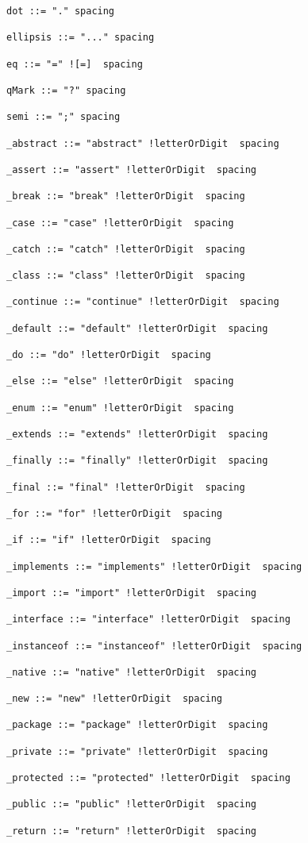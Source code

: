 \begin{lstlisting}[breaklines=true]
dot ::= "." spacing

ellipsis ::= "..." spacing

eq ::= "=" ![=]  spacing

qMark ::= "?" spacing

semi ::= ";" spacing

_abstract ::= "abstract" !letterOrDigit  spacing

_assert ::= "assert" !letterOrDigit  spacing

_break ::= "break" !letterOrDigit  spacing

_case ::= "case" !letterOrDigit  spacing

_catch ::= "catch" !letterOrDigit  spacing

_class ::= "class" !letterOrDigit  spacing

_continue ::= "continue" !letterOrDigit  spacing

_default ::= "default" !letterOrDigit  spacing

_do ::= "do" !letterOrDigit  spacing

_else ::= "else" !letterOrDigit  spacing

_enum ::= "enum" !letterOrDigit  spacing

_extends ::= "extends" !letterOrDigit  spacing

_finally ::= "finally" !letterOrDigit  spacing

_final ::= "final" !letterOrDigit  spacing

_for ::= "for" !letterOrDigit  spacing

_if ::= "if" !letterOrDigit  spacing

_implements ::= "implements" !letterOrDigit  spacing

_import ::= "import" !letterOrDigit  spacing

_interface ::= "interface" !letterOrDigit  spacing

_instanceof ::= "instanceof" !letterOrDigit  spacing

_native ::= "native" !letterOrDigit  spacing

_new ::= "new" !letterOrDigit  spacing

_package ::= "package" !letterOrDigit  spacing

_private ::= "private" !letterOrDigit  spacing

_protected ::= "protected" !letterOrDigit  spacing

_public ::= "public" !letterOrDigit  spacing

_return ::= "return" !letterOrDigit  spacing


\end{lstlisting}
